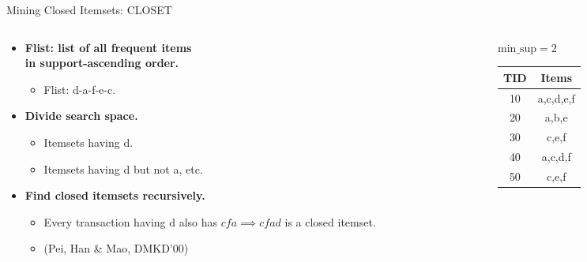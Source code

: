 \begin{frame}{Mining Closed Itemsets: CLOSET}
	\begin{columns}
		\begin{column}{0.6\textwidth}
			\begin{itemize}
				\item \textbf{Flist: list of all frequent items \\ in
					      support-ascending order.}
				      \begin{itemize}
					      \item Flist: d-a-f-e-c.
				      \end{itemize}
				\item \textbf{Divide search space.}
				      \begin{itemize}
					      \item Itemsets having d.
					      \item Itemsets having d but not a, etc.
				      \end{itemize}
				\item \textbf{Find closed itemsets recursively.}
				      \begin{itemize}
					      \item Every transaction having d also has $cfa \implies
						            cfad$ is a closed itemset.
					      \item (Pei, Han \& Mao, DMKD'00)
				      \end{itemize}
			\end{itemize}
		\end{column}
		\begin{column}{0.3\textwidth}
			$\text{min\_sup} =2$ \\[0.2cm]
			\begin{tabular}{|c|c|}
				\hline
				TID & Items     \\\hline
				10  & a,c,d,e,f \\\hline
				20  & a,b,e     \\\hline
				30  & c,e,f     \\\hline
				40  & a,c,d,f   \\\hline
				50  & c,e,f     \\\hline
			\end{tabular}
		\end{column}
	\end{columns}
\end{frame}

